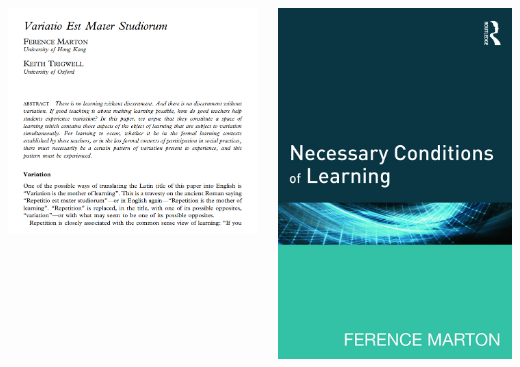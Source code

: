 \begin{frame}
  \begin{remark}
    \begin{columns}[T]
      \begin{column}{0.6\columnwidth}
          \centering
          \includegraphics[width=0.8\columnwidth]{figs/variatio-mater-studiorum.png}
        \end{column}
        \begin{column}{0.4\columnwidth}
          \includegraphics[height=0.55\textheight]{figs/NCOL.jpg}

\end{column}
\end{columns}
\end{remark}
\end{frame}
